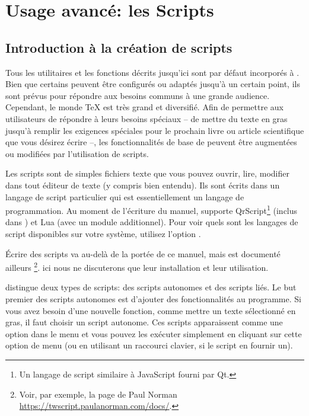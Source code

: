 
\chapter{Usage avanc{\'e}: les Scripts}

\section{Introduction à la création de scripts}

Tous les utilitaires et les fonctions décrits jusqu'ici sont par défaut incorporés à \Tw. Bien que certains peuvent être configurés ou adaptés jusqu'à un certain point, ils sont prévus pour répondre aux besoins communs à une grande audience. Cependant, le monde \TeX{} est très grand et diversifié. Afin de permettre aux utilisateurs de répondre à leurs besoins spéciaux -- de mettre du texte en gras jusqu'à remplir les exigences spéciales pour le prochain livre ou article scientifique que vous désirez écrire --, les fonctionnalités de base de \Tw{} peuvent être augmentées ou modifiées par l'utilisation de scripts.

Les scripts sont de simples fichiers texte que vous pouvez ouvrir, lire, modifier dans tout éditeur de texte (y compris \Tw{} bien entendu). Ils sont écrits dans un langage de script particulier qui est essentiellement un langage de programmation. Au moment de l'écriture du manuel, \Tw{} supporte QrScript\footnote{Un langage de script similaire à JavaScript fourni par Qt.} (inclus dans \Tw) et Lua (avec un module additionnel).%
Pour voir quels sont les langages de script disponibles sur votre système, utilisez l'option \submenu{}\submenu{}.

Écrire des scripts va au-delà de la portée de ce manuel, mais est documenté ailleurs \footnote{Voir, par exemple, la page de Paul Norman \url{https://twscript.paulanorman.com/docs/}.}. ici nous ne discuterons que leur installation et leur utilisation.

\Tw{} distingue deux types de scripts: des scripts autonomes et des scripts liés. Le but premier des scripts autonomes est d'ajouter des fonctionnalités au programme. Si vous avez besoin d'une nouvelle fonction, comme mettre un texte sélectionné en gras, il faut choisir un script autonome. Ces scripts apparaissent comme une option dans le menu  et vous pouvez les exécuter simplement en cliquant sur cette option de menu (ou en utilisant un raccourci clavier, si le script en fournir un).

